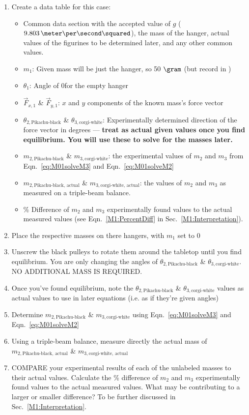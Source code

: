 \begin{enumerate}
\item Create a data table for this case:
\begin{itemize}
    \item Common data section with the accepted value of $g$ ($9.803\,\meter\per\second\squared$), the mass of the hanger, actual values of the figurines to be determined later, and any other common values.
    \item $m_1$: Given mass will be just the hanger, so 50 $\gram$ (but record in \kilo\gram)
    \item $\theta_1$: Angle of 0\degree for the empty hanger
    \item $\vec{F}_{x,1}$ \& $\vec{F}_{y,1}$: $x$ and $y$ components of the known mass's force vector
    \item $\theta_{2,\text{Pikachu-black}}$ \& $\theta_{3,\text{corgi-white}}$: Experimentally determined direction of the force vector in degrees --- \textbf{treat as actual given values once you find equilibrium. You will use these to solve for the masses later.}
    \item $m_{2,\text{Pikachu-black}}$ \& $m_{3,\text{corgi-white}}$: the experimental values of $m_2$ and $m_3$ from Eqn.~\ref{eq:M01solveM3} and Eqn.~\ref{eq:M01solveM2}
    \item $m_{2,\text{Pikachu-black, actual}}$ \& $m_{3,\text{corgi-white, actual}}$: the values of $m_2$ and $m_3$ as measured on a triple-beam balance.
    \item \% Difference of $m_2$ and $m_3$ experimentally found values to the actual measured values (see Eqn.~\ref{M1:PercentDiff} in Sec.~\ref{M1:Interpretation}).
\end{itemize}



    \item Place the respective masses on there hangers, with $m_1$ set to 0\degree
    \item Unscrew the black pulleys to rotate them around the tabletop until you find equilibrium. You are only changing the angles of $\theta_{2,\text{Pikachu-black}}$ \& $\theta_{3,\text{corgi-white}}$. NO ADDITIONAL MASS IS REQUIRED.
    \item Once you've found equilibrium, note the $\theta_{2,\text{Pikachu-black}}$ \& $\theta_{3,\text{corgi-white}}$ values as actual values to use in later equations (i.e. as if they're given angles)
    \item Determine $m_{2,\text{Pikachu-black}}$ \& $m_{3,\text{corgi-white}}$ using Eqn.~\ref{eq:M01solveM3} and Eqn.~\ref{eq:M01solveM2}
    \item Using a triple-beam balance, measure directly the actual mass of $m_{2,\text{Pikachu-black, actual}}$ \& $m_{3,\text{corgi-white, actual}}$
    \item COMPARE your experimental results of each of the unlabeled masses to their actual values. Calculate the \% difference of $m_2$ and $m_3$ experimentally found values to the actual measured values. What may be contributing to a larger or smaller difference? To be further discussed in Sec.~\ref{M1:Interpretation}.

\end{enumerate}


